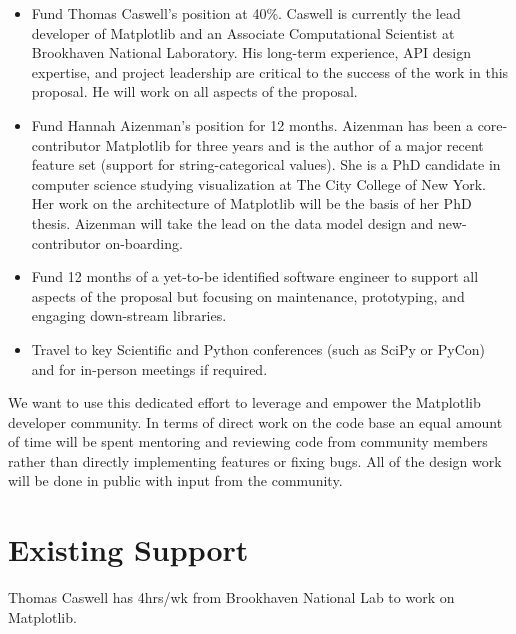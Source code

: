 \documentclass[11pt]{article}  %
\begin{document}
\begin{itemize}[noitemsep]

\item Fund Thomas Caswell's position at 40\%.  Caswell is
  currently the lead developer of Matplotlib and an Associate
  Computational Scientist at Brookhaven National Laboratory.  His
  long-term experience, API design expertise, and project leadership
  are critical to the success of the work in this proposal.  He will work
  on all aspects of the proposal.
\item Fund Hannah Aizenman's position for 12 months.  Aizenman has
  been a core-contributor Matplotlib for three years and is the author of a major recent feature set (support for string-categorical values).  She
  is a PhD candidate in computer science studying visualization at The
  City College of New York.  Her work on the architecture of
  Matplotlib will be the basis of her PhD thesis.  Aizenman will take
  the lead on the data model design and new-contributor on-boarding.
\item Fund 12 months of a yet-to-be identified software engineer to
  support all aspects of the proposal but focusing on maintenance,
  prototyping, and engaging down-stream libraries.
\item Travel to key Scientific and Python conferences (such as SciPy
  or PyCon) and for in-person meetings if required.
\end{itemize}

We want to use this dedicated effort to leverage and empower the
Matplotlib developer community.  In terms of direct work on the code
base an equal amount of time will be spent mentoring and reviewing
code from community members rather than directly implementing features
or fixing bugs.  All of the design work will be done in public with
input from the community.



\section{Existing Support}

Thomas Caswell has 4hrs/wk from Brookhaven National Lab to work on
Matplotlib.


\clearpage

\end{document}
